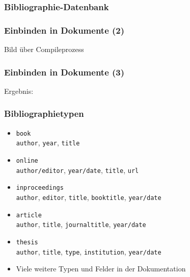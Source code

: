 \begin{frame}[fragile]
  \frametitle{Bibliographie-Datenbank}
  
  \begingroup
  \printbibliography[heading=none,keyword=bibexample]
  \endgroup
\end{frame}

\begin{frame}
  \frametitle{Einbinden in Dokumente}
  TeX}]{examples/bibliography/basic.tex}
\end{frame}

\begin{frame}
  \frametitle{Einbinden in Dokumente (2)}
  Bild über Compileprozess
\end{frame}

\begin{frame}
  \frametitle{Einbinden in Dokumente (3)}
  Ergebnis:
\end{frame}

\begin{frame}
  \frametitle{Bibliographietypen}
  \begin{itemize}
  \item \texttt{book}\\
    \texttt{author}, \texttt{year}, \texttt{title}
  \item \texttt{online}\\
    \texttt{author/editor}, \texttt{year/date}, \texttt{title},
    \texttt{url}
  \item \texttt{inproceedings}\\
    \texttt{author}, \texttt{editor}, \texttt{title},
    \texttt{booktitle}, \texttt{year/date}
  \item \texttt{article}\\
    \texttt{author}, \texttt{title}, \texttt{journaltitle},
    \texttt{year/date}
  \item \texttt{thesis}\\
    \texttt{author}, \texttt{title}, \texttt{type},
    \texttt{institution}, \texttt{year/date}
  \item Viele weitere Typen und Felder in der Dokumentation
  \end{itemize}
\end{frame}

